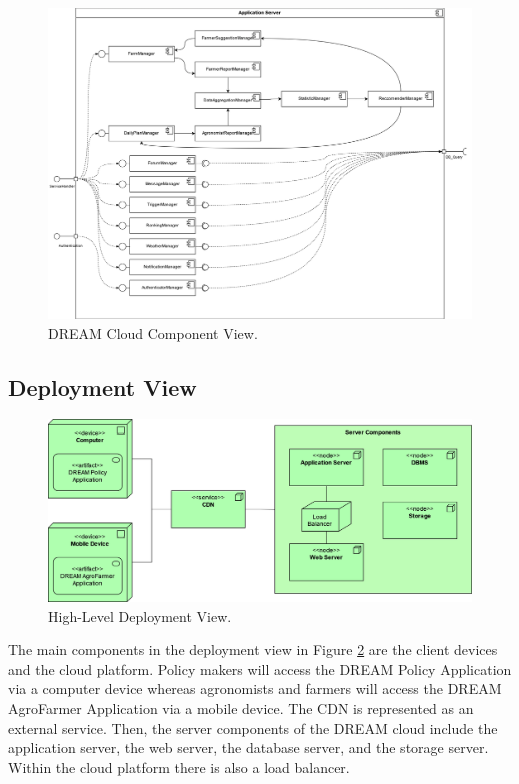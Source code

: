\clearpage
\begin{figure}[hbt!]
\centering
\includegraphics[width=\textwidth]{../images_diagrams/dd/component_only_application.png}
\caption{DREAM Cloud Component View.}
\label{fig:ApplicationServerOnlyComp}
\end{figure}

\subsection{Deployment View}
\begin{figure}[hbt!]
\centering
\includegraphics[width=\textwidth]{../images_diagrams/dd/highlevel_deployment.png}
\caption{High-Level Deployment View.}
\label{fig:highLevelDeploy}
\end{figure}

\begin{flushleft}
The main components in the deployment view in Figure \ref{fig:highLevelDeploy} are the client devices and the cloud platform. Policy makers will access the DREAM Policy Application via a computer device whereas agronomists and farmers will access the DREAM AgroFarmer Application via a mobile device. The CDN is represented as an external service. Then, the server components of the DREAM cloud include the application server, the web server, the database server, and the storage server. Within the cloud platform there is also a load balancer.
\end{flushleft}


